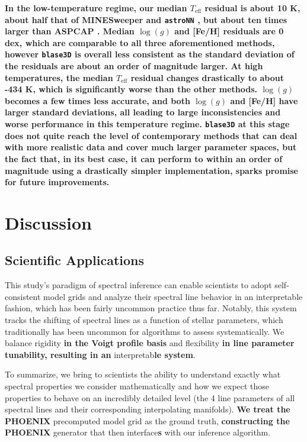 \documentclass[twocolumn, linenumbers]{aastex631}
\begin{document}
\textbf{In the low-temperature regime, our median $T_\text{eff}$ residual is about 10 K, about half that of MINESweeper \citep{minesweeper} and \texttt{astroNN} \citep{leung2019}, but about ten times larger than ASPCAP \citep{ASPCAP}.
Median $\log(g)$ and [Fe/H] residuals are 0 dex, which are comparable to all three aforementioned methods, however \texttt{blase3D} is overall less consistent as the standard deviation of the residuals are about an order of magnitude larger.
At high temperatures, the median $T_\text{eff}$ residual changes drastically to about -434 K, which is significantly worse than the other methods.
$\log(g)$ becomes a few times less accurate, and both $\log(g)$ and [Fe/H] have larger standard deviations, all leading to large inconsistencies and worse performance in this temperature regime.
\texttt{blase3D} at this stage does not quite reach the level of contemporary methods that can deal with more realistic data and cover much larger parameter spaces, but the fact that, in its best case, it can perform to within an order of magnitude using a drastically simpler implementation, sparks promise for future improvements.}

\section{Discussion}
\subsection{Scientific Applications}
This study's paradigm of spectral inference can enable scientists to adopt self-consistent model grids and analyze their spectral line behavior in an interpretable fashion, which has been fairly uncommon practice thus far.
Notably, this system tracks the shifting of spectral lines as a function of stellar parameters, which traditionally has been uncommon for algorithms to assess systematically.
We balance rigidity \textbf{in the Voigt profile basis} and flexibility \textbf{in line parameter tunability, resulting in an} interpretab\textbf{le system}.

To summarize, we bring to scientists the ability to understand exactly what spectral properties we consider mathematically and how we expect those properties to behave on an incredibly detailed level (the 4 line parameters of all spectral lines and their corresponding interpolating manifolds). \textbf{We treat the PHOENIX} precomputed model grid as the ground truth, \textbf{constructing the PHOENIX} generator that then interface\textbf{s} with our inference algorithm.
\end{document}
